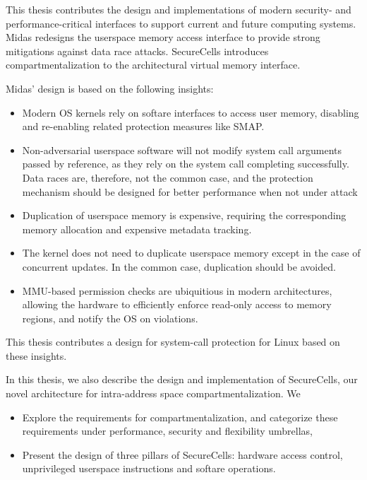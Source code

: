 This thesis contributes the design and implementations of modern
security- and performance-critical interfaces to support 
current and future computing systems.
Midas redesigns the userspace memory access interface to provide
strong mitigations against data race attacks.
SecureCells introduces compartmentalization to the architectural
virtual memory interface.

Midas' design is based on the following insights:
\begin{itemize}
  \item Modern OS kernels rely on softare interfaces to access
        user memory, disabling and re-enabling related
        protection measures like SMAP.
  \item Non-adversarial userspace software will not modify
        system call arguments passed by reference, as they
        rely on the system call completing successfully.
        Data races are, therefore, not the common case, and
        the protection mechanism should be designed for better
        performance when not under attack
  \item Duplication of userspace memory is expensive, requiring
        the corresponding memory allocation and expensive
        metadata tracking.
  \item The kernel does not need to duplicate userspace memory
        except in the case of concurrent updates. In the common
        case, duplication should be avoided.
  \item MMU-based permission checks are ubiquitious in modern
        architectures, allowing the hardware to efficiently
        enforce read-only access to memory regions, and
        notify the OS on violations.
\end{itemize}
This thesis contributes a design for system-call protection for Linux
based on these insights.

In this thesis, we also describe the design and implementation of
SecureCells, our novel architecture for intra-address space
compartmentalization.
We
\begin{itemize}
  \item Explore the requirements for compartmentalization, and
        categorize these requirements under performance, security
        and flexibility umbrellas,
  \item Present the design of three pillars of SecureCells: 
        hardware access control, unprivileged userspace instructions
        and softare operations.
\end{itemize}


